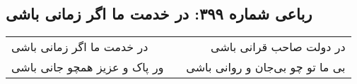 \begin{center}
\section*{رباعی شماره ۳۹۹: در خدمت ما اگر زمانی باشی}
\label{sec:sh399}
\begin{longtable}{l p{0.5cm} r}
در خدمت ما اگر زمانی باشی
&&
در دولت صاحب قرانی باشی
\\
ور پاک و عزیز همچو جانی باشی
&&
بی ما تو چو بی‌جان و روانی باشی
\\
\end{longtable}
\end{center}
